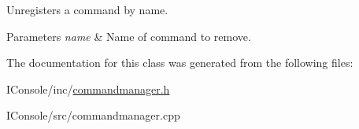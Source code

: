 Unregisters a command by name. 


\begin{DoxyParams}{Parameters}
{\em name} & Name of command to remove. \\
\hline
\end{DoxyParams}


The documentation for this class was generated from the following files\-:\begin{DoxyCompactItemize}
\item 
I\-Console/inc/\hyperlink{commandmanager_8h}{commandmanager.\-h}\item 
I\-Console/src/commandmanager.\-cpp\end{DoxyCompactItemize}
